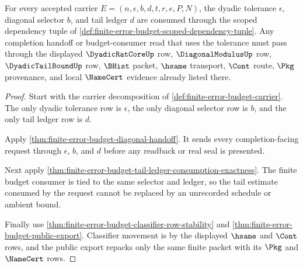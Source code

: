 \begin{theorem}
\label{thm:finite-error-budget-dyadic-tolerance-scope}
For every accepted carrier $E=(n,\epsilon,b,d,t,r,e,P,N)$, the dyadic
tolerance $\epsilon$, diagonal selector $b$, and tail ledger $d$ are consumed
through the scoped dependency tuple of
\autoref{def:finite-error-budget-scoped-dependency-tuple}. Any completion
handoff or budget-consumer read that uses the tolerance must pass through the
displayed $\DyadicRatCoreUp$ row, $\DiagonalModulusUp$ row,
$\DyadicTailBoundUp$ row, $\BHist$ packet, $\hsame$ transport, $\Cont$ route,
$\Pkg$ provenance, and local $\NameCert$ evidence already listed there.
\end{theorem}
\begin{proof}
Start with the carrier decomposition of
\autoref{def:finite-error-budget-carrier}. The only dyadic tolerance row is
$\epsilon$, the only diagonal selector row is $b$, and the only tail ledger row
is $d$.

Apply \autoref{thm:finite-error-budget-diagonal-handoff}. It sends every
completion-facing request through $\epsilon$, $b$, and $d$ before any readback
or real seal is presented.

Next apply
\autoref{thm:finite-error-budget-tail-ledger-consumption-exactness}. The
finite budget consumer is tied to the same selector and ledger, so the tail
estimate consumed by the request cannot be replaced by an unrecorded schedule
or ambient bound.

Finally use \autoref{thm:finite-error-budget-classifier-row-stability} and
\autoref{thm:finite-error-budget-public-export}. Classifier movement is by the
displayed $\hsame$ and $\Cont$ rows, and the public export repacks only the
same finite packet with its $\Pkg$ and $\NameCert$ rows.
\end{proof}

